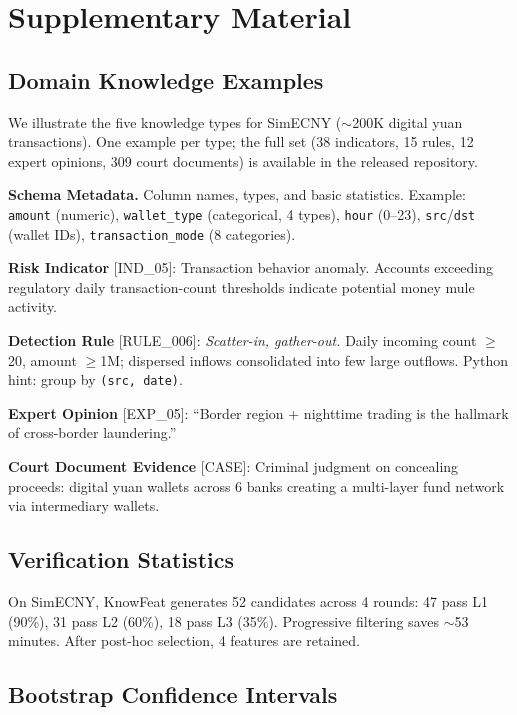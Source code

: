 \appendix
\section{Supplementary Material}
\label{sec:appendix}

\subsection{Domain Knowledge Examples}
\label{sec:appendix_knowledge}

We illustrate the five knowledge types for SimECNY ($\sim$200K digital yuan transactions). One example per type; the full set (38 indicators, 15 rules, 12 expert opinions, 309 court documents) is available in the released repository.

\smallskip\noindent\textbf{Schema Metadata.}
Column names, types, and basic statistics. Example: \texttt{amount} (numeric), \texttt{wallet\_type} (categorical, 4 types), \texttt{hour} (0--23), \texttt{src}/\texttt{dst} (wallet IDs), \texttt{transaction\_mode} (8 categories).

\smallskip\noindent\textbf{Risk Indicator} [IND\_05]:
Transaction behavior anomaly. Accounts exceeding regulatory daily transaction-count thresholds indicate potential money mule activity.

\smallskip\noindent\textbf{Detection Rule} [RULE\_006]:
\emph{Scatter-in, gather-out.} Daily incoming count $\geq$20, amount $\geq$1M; dispersed inflows consolidated into few large outflows. Python hint: group by \texttt{(src, date)}.

\smallskip\noindent\textbf{Expert Opinion} [EXP\_05]:
``Border region + nighttime trading is the hallmark of cross-border laundering.''

\smallskip\noindent\textbf{Court Document Evidence} [CASE]:
Criminal judgment on concealing proceeds: digital yuan wallets across 6 banks creating a multi-layer fund network via intermediary wallets.

\subsection{Verification Statistics}
On SimECNY, KnowFeat generates 52 candidates across 4 rounds: 47 pass L1 (90\%), 31 pass L2 (60\%), 18 pass L3 (35\%). Progressive filtering saves $\sim$53 minutes. After post-hoc selection, 4 features are retained.

\subsection{Bootstrap Confidence Intervals}

